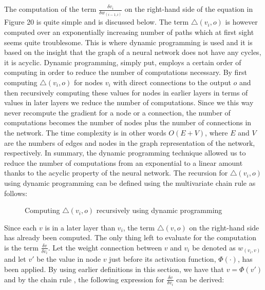 \documentclass[titlepage]{article}
\begin{document}
\noindent
The computation of the term $\frac{\delta v_{i}}{\delta w_{(i-1, i)}}$ on the right-hand side of the equation in Figure 20 is quite simple and is discussed below. The term $\triangle (v_{i}, o)$ is however computed over an exponentially increasing number of paths which at first sight seems quite troublesome. This is where dynamic programming is used and it is based on the insight that the graph of a neural network does not have any cycles, it is acyclic. Dynamic programming, simply put, employs a certain order of computing in order to reduce the number of computations necessary. By first computing $\triangle (v_{i}, o)$ for nodes $v_{i}$ with direct connections to the output $o$ and then recursively computing these values for nodes in earlier layers in terms of values in later layers we reduce the number of computations. Since we this way never recompute the gradient for a node or a connection, the number of computations becomes the number of nodes plus the number of connections in the network. The time complexity is in other words $O(E + V)$, where $E$ and $V$ are the numbers of edges and nodes in the graph representation of the network, respectively. In summary, the dynamic programming technique allowed us to reduce the number of computations from an exponential to a linear amount thanks to the acyclic property of the neural network. The recursion for $\triangle (v_{i}, o)$ using dynamic programming can be defined using the multivariate chain rule as follows:

\vskip 0.3cm

\begin{figure}[h]
    \centerline{
    }
    \vskip 0.3cm
    \caption{Computing $\triangle (v_{i}, o)$ recursively using dynamic programming}
\end{figure}

\vskip 0.2cm

\noindent
Since each $v$ is in a later layer than $v_{i}$, the term $\triangle (v, o)$ on the right-hand side has already been computed. The only thing left to evaluate for the computation is the term $\frac{\delta v}{\delta v_{i}}$. Let the weight connection between $v$ and $v_{i}$ be denoted as $w_{(v_{i}, v)}$ and let $v'$ be the value in node $v$ just before its activation function, $\Phi(\cdot)$, has been applied. By using earlier definitions in this section, we have that $v = \Phi(v')$ and by the chain rule \cite{charu}, the following expression for $\frac{\delta v}{\delta v_{i}}$ can be derived:
\end{document}
